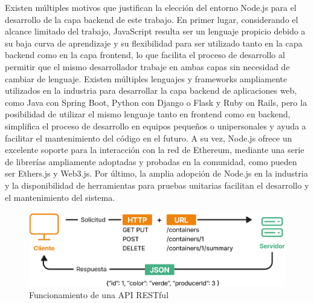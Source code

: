 Existen múltiples motivos que justifican la elección del entorno Node.js para el desarrollo de la capa backend de este trabajo. En primer lugar, considerando el alcance limitado del trabajo, JavaScript resulta ser un lenguaje propicio debido a su baja curva de aprendizaje y su flexibilidad para ser utilizado tanto en la capa backend como en la capa frontend, lo que facilita el proceso de desarrollo al permitir que el mismo desarrollador trabaje en ambas capas sin necesidad de cambiar de lenguaje. Existen múltiples lenguajes y frameworks ampliamente utilizados en la industria para desarrollar la capa backend de aplicaciones web, como Java con Spring Boot, Python con Django o Flask y Ruby on Rails, pero la posibilidad de utilizar el mismo lenguaje tanto en frontend como en backend, simplifica el proceso de desarrollo en equipos pequeños o unipersonales y ayuda a facilitar el mantenimiento del código en el futuro. A su vez, Node.js ofrece un excelente soporte para la interacción con la red de Ethereum, mediante una serie de librerías ampliamente adoptadas y probadas en la comunidad, como pueden ser Ethers.js y Web3.js. Por último, la amplia adopción de Node.js en la industria y la disponibilidad de herramientas para pruebas unitarias facilitan el desarrollo y el mantenimiento del sistema. 

\begin{figure}[!htb]
    \centering
    \includegraphics[width=\linewidth]{Figures/backend-api-rest.png}
    \caption{Funcionamiento de una API RESTful}
    \label{fig:api-rest}
\end{figure}


